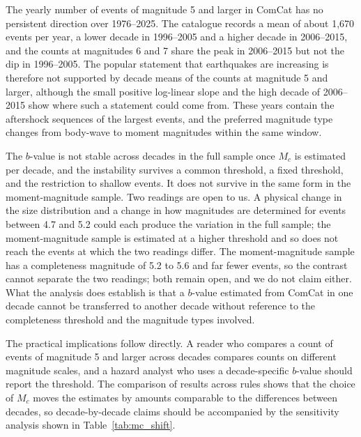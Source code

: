 \documentclass[11pt]{article}
\begin{document}
The yearly number of events of magnitude 5 and larger in ComCat has no persistent direction over 1976--2025. The catalogue records a mean of about 1,670 events per year, a lower decade in 1996--2005 and a higher decade in 2006--2015, and the counts at magnitudes 6 and 7 share the peak in 2006--2015 but not the dip in 1996--2005. The popular statement that earthquakes are increasing is therefore not supported by decade means of the counts at magnitude 5 and larger, although the small positive log-linear slope and the high decade of 2006--2015 show where such a statement could come from. These years contain the aftershock sequences of the largest events, and the preferred magnitude type changes from body-wave to moment magnitudes within the same window.

The $b$-value is not stable across decades in the full sample once $M_c$ is estimated per decade, and the instability survives a common threshold, a fixed threshold, and the restriction to shallow events. It does not survive in the same form in the moment-magnitude sample. Two readings are open to us. A physical change in the size distribution and a change in how magnitudes are determined for events between 4.7 and 5.2 could each produce the variation in the full sample; the moment-magnitude sample is estimated at a higher threshold and so does not reach the events at which the two readings differ. The moment-magnitude sample has a completeness magnitude of 5.2 to 5.6 and far fewer events, so the contrast cannot separate the two readings; both remain open, and we do not claim either. What the analysis does establish is that a $b$-value estimated from ComCat in one decade cannot be transferred to another decade without reference to the completeness threshold and the magnitude types involved.

The practical implications follow directly. A reader who compares a count of events of magnitude 5 and larger across decades compares counts on different magnitude scales, and a hazard analyst who uses a decade-specific $b$-value should report the threshold. The comparison of results across rules shows that the choice of $M_c$ moves the estimates by amounts comparable to the differences between decades, so decade-by-decade claims should be accompanied by the sensitivity analysis shown in Table~\ref{tab:mc_shift}.
\end{document}
